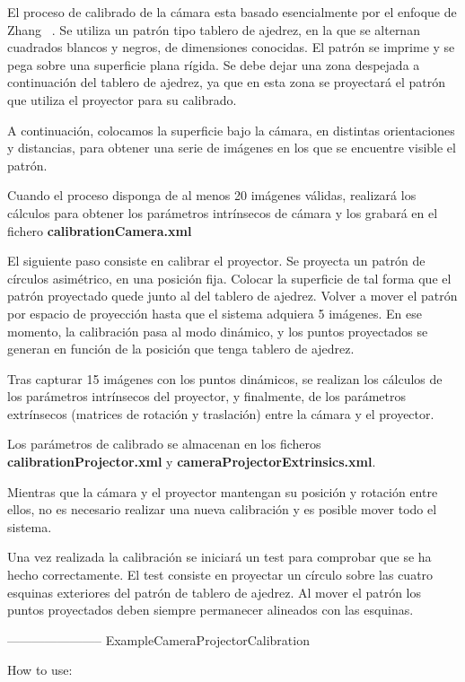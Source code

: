El proceso de calibrado de la cámara esta basado esencialmente por el enfoque de Zhang
~\cite{Zhang:1999:FCCVPFUO}. Se utiliza un patrón tipo tablero de ajedrez, en la que se alternan
cuadrados blancos y negros, de dimensiones conocidas. El patrón se imprime y se pega sobre una
superficie plana rígida. Se debe dejar una zona despejada a continuación del tablero de ajedrez, ya
que en esta zona se proyectará el patrón que utiliza el proyector para su calibrado.

A continuación, colocamos la superficie bajo la cámara, en distintas orientaciones y distancias,
para obtener una serie de imágenes en los que se encuentre visible el patrón.

Cuando el proceso disponga de al menos 20 imágenes válidas, realizará los cálculos para obtener los
parámetros intrínsecos de cámara y los grabará en el fichero \textbf{calibrationCamera.xml}

El siguiente paso consiste en calibrar el proyector. Se proyecta un patrón de círculos asimétrico,
en una posición fija. Colocar la superficie de tal forma que el patrón proyectado quede junto al del
tablero de ajedrez. Volver a mover el patrón por espacio de proyección hasta que el sistema adquiera
5 imágenes. En ese momento, la calibración pasa al modo dinámico, y los puntos proyectados se
generan en función de la posición que tenga tablero de ajedrez.

Tras capturar 15 imágenes con los puntos dinámicos, se realizan los cálculos de los parámetros
intrínsecos del proyector, y finalmente, de los parámetros extrínsecos (matrices de rotación y
traslación) entre la cámara y el proyector.

Los parámetros de calibrado se almacenan en los ficheros \textbf{calibrationProjector.xml} y
\textbf{cameraProjectorExtrinsics.xml}.

Mientras que la cámara y el proyector mantengan su posición y rotación entre ellos, no es necesario
realizar una nueva calibración y es posible mover todo el sistema.

Una vez realizada la calibración se iniciará un test para comprobar que se ha hecho
correctamente. El test consiste en proyectar un círculo sobre las cuatro esquinas exteriores del
patrón de tablero de ajedrez. Al mover el patrón los puntos proyectados deben siempre permanecer
alineados con las esquinas.

-----------------------
ExampleCameraProjectorCalibration

How to use:

